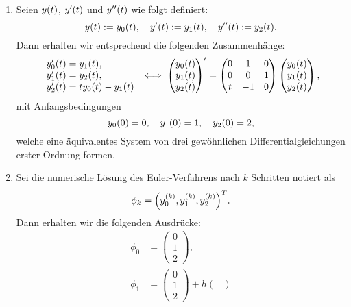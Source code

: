 \documentclass{exercise}
\begin{document}
	\begin{enumerate}
		\item Seien \(y\parentheses*{t}\), \(y'\parentheses*{t}\) und \(y''\parentheses*{t}\) wie folgt definiert:
		\[
			y\parentheses*{t} := y_0\parentheses*{t}, \quad y'\parentheses*{t} := y_1\parentheses*{t}, \quad y''\parentheses*{t} := y_2\parentheses*{t}.
		\]
		Dann erhalten wir entsprechend die folgenden Zusammenhänge:
		\[
			\begin{array}{l}
				y_0'\parentheses*{t} = y_1\parentheses*{t},\\
				y_1'\parentheses*{t} = y_2\parentheses*{t},\\
				y_2'\parentheses*{t} = ty_0\parentheses*{t} - y_1\parentheses*{t}
			\end{array} \iff \begin{pmatrix}
				y_0\parentheses*{t}\\
				y_1\parentheses*{t}\\
				y_2\parentheses*{t}
			\end{pmatrix}' = \begin{pmatrix}
				0 & 1 & 0\\
				0 & 0 & 1\\
				t & -1 & 0
			\end{pmatrix}\begin{pmatrix}
				y_0\parentheses*{t}\\
				y_1\parentheses*{t}\\
				y_2\parentheses*{t}
			\end{pmatrix},
		\]
		mit Anfangsbedingungen
		\[
			y_0\parentheses*{0} = 0, \quad y_1\parentheses*{0} = 1, \quad y_2\parentheses*{0} = 2,
		\]
		welche eine äquivalentes System von drei gewöhnlichen Differentialgleichungen erster Ordnung formen.
		\item Sei die numerische Lösung des Euler-Verfahrens nach \(k\) Schritten notiert als
		\[
			\phi_k = \parentheses*{y_0^{\parentheses*{k}}, y_1^{\parentheses*{k}}, y_2^{\parentheses*{k}}}^T.
		\]
		Dann erhalten wir die folgenden Ausdrücke:
		\begin{align*}
			\phi_0 &= \begin{pmatrix}
				0\\
				1\\
				2
			\end{pmatrix},\\
			\phi_1 &= \begin{pmatrix}
				0\\
				1\\
				2
			\end{pmatrix} + h\begin{pmatrix}

\end{pmatrix}
\end{align*}
\end{enumerate}
\end{document}
